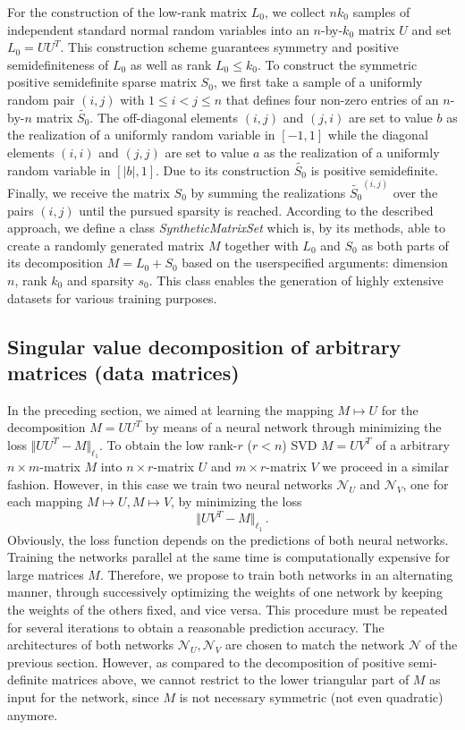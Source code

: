 For the construction of the low-rank matrix $L_0$, we collect $nk_0$ samples of independent standard normal random variables into an $n$-by-$k_0$ matrix $U$ and set $L_0 = UU^T$. This construction scheme guarantees symmetry and positive semidefiniteness of $L_0$ as well as rank $L_0 \leq k_0$. To construct the symmetric positive semidefinite sparse matrix $S_0$, we first take a sample of a uniformly random pair $(i,j)$ with $1 \leq i < j \leq n$ that defines four non-zero entries of an $n$-by-$n$ matrix $\tilde{S_0}$. The off-diagonal elements $(i,j)$ and $(j,i)$ are set to value $b$ as the realization of a uniformly random variable in $[-1,1]$ while the diagonal elements $(i,i)$ and $(j,j)$ are set to value $a$ as the realization of a uniformly random variable in $[\vert b \vert,1]$. Due to its construction $\tilde{S_0}$ is positive semidefinite. Finally, we receive the matrix $S_0$ by summing the realizations $\tilde{S_0}^{(i,j)}$ over the pairs $(i,j)$ until the pursued sparsity is reached. According to the described approach, we define a class \textit{SyntheticMatrixSet} which is, by its methods, able to create a randomly generated matrix $M$ together with $L_0$ and $S_0$ as both parts of its decomposition  $M = L_0 + S_0$ based on the userspecified arguments: dimension $n$, rank $k_0$ and sparsity $s_0$. This class enables the generation of highly extensive datasets for various training purposes.


\subsection{Singular value decomposition of arbitrary matrices (data matrices)}

In the preceding section, we aimed at learning the mapping $M\mapsto U$ for the decomposition $M = UU^T$ by means of a neural network through minimizing the loss $\Vert UU^T - M \Vert_{\ell_1}$. To obtain the low rank-$r$ ($r<n$) SVD $M = UV^T$ of a arbitrary $n\times m$-matrix $M$ into $n\times r$-matrix $U$ and $m\times r$-matrix $V$ we proceed in a similar fashion. However, in this case we train two neural networks $\mathcal{N}_U$ and $\mathcal{N}_V$, one for each mapping $M\mapsto U, M\mapsto V$, by minimizing the loss
\[
\Vert UV^T - M \Vert_{\ell_1} \,.
\]
Obviously, the loss function depends on the predictions of both neural networks. Training the networks parallel at the same time is computationally expensive for large matrices $M$. Therefore, we propose to train both networks in an alternating manner, through successively optimizing the weights of one network by keeping the weights of the others fixed, and vice versa. This procedure must be repeated for several iterations to obtain a reasonable prediction accuracy. The architectures of both networks $\mathcal{N}_U,\mathcal{N}_V$ are chosen to match the network $\mathcal{N}$ of the previous section. However, as compared to the decomposition of positive semi-definite matrices above, we cannot restrict to the lower triangular part of $M$ as input for the network, since $M$ is not necessary symmetric (not even quadratic) anymore.

